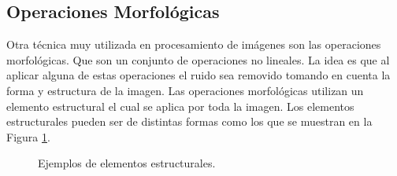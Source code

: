 \subsection{Operaciones Morfológicas}\label{subsec:OperacionesMorfologicas} 

Otra técnica muy utilizada en procesamiento de imágenes son las operaciones morfológicas. Que son un conjunto de operaciones no lineales. La idea es que al aplicar alguna de estas operaciones el ruido sea removido tomando en cuenta la forma y estructura de la imagen. 
Las operaciones morfológicas \citep{Premaratne2013} utilizan un elemento estructural el cual se aplica por toda la imagen. 
Los elementos estructurales pueden ser de distintas formas como los que se muestran en la Figura \ref{fig:EX}.
\begin{figure}[h!]
\centering
{} \qquad
{} \qquad
{} 
\caption{Ejemplos de elementos estructurales.} \label{fig:EX}
\end{figure} 

